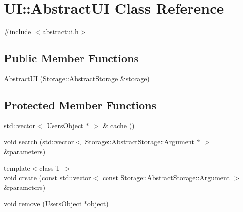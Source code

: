 \hypertarget{classUI_1_1AbstractUI}{
\section{UI::AbstractUI Class Reference}
\label{de/dda/classUI_1_1AbstractUI}
}


{\ttfamily \#include $<$abstractui.h$>$}

\subsection*{Public Member Functions}
\begin{DoxyCompactItemize}
\item 
\hyperlink{classUI_1_1AbstractUI_a35092e69be8cc4406582540286db5a69}{AbstractUI} (\hyperlink{classStorage_1_1AbstractStorage}{Storage::AbstractStorage} \&storage)
\end{DoxyCompactItemize}
\subsection*{Protected Member Functions}
\begin{DoxyCompactItemize}
\item 
std::vector$<$ \hyperlink{classUI_1_1UsersObject}{UsersObject} $\ast$ $>$ \& \hyperlink{classUI_1_1AbstractUI_ab09dc4b586d429a5238d1b09c98d2a4b}{cache} ()
\item 
void \hyperlink{classUI_1_1AbstractUI_aaa55abbdeb863b8189393e929f643335}{search} (std::vector$<$ \hyperlink{structStorage_1_1AbstractStorage_1_1Argument}{Storage::AbstractStorage::Argument} $\ast$ $>$ \&parameters)
\item 
{\footnotesize template$<$class T $>$ }\\void \hyperlink{classUI_1_1AbstractUI_a485b7a347d6b07f6dc44a3174cb96eaa}{create} (const std::vector$<$ const \hyperlink{structStorage_1_1AbstractStorage_1_1Argument}{Storage::AbstractStorage::Argument} $>$ \&parameters)
\item 
void \hyperlink{classUI_1_1AbstractUI_a160bde97ba2106267a8850db226d9790}{remove} (\hyperlink{classUI_1_1UsersObject}{UsersObject} $\ast$object)
\end{DoxyCompactItemize}


